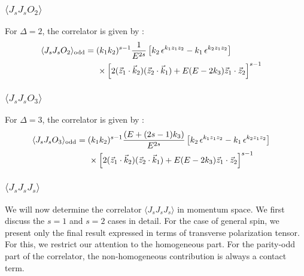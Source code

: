 \documentclass[a4paper,11pt]{article}
\begin{document}
\subsubsection*{$\langle J_sJ_sO_{2}\rangle$}
For $\Delta=2$, the correlator is given by :
\begin{align}
\langle J_sJ_sO_{2}\rangle_{\text{odd}}&=(k_1 k_2)^{s-1}\frac{1}{E^{2s}}\left[k_2\,\epsilon^{ k_1 z_1 z_2}- k_1\,\epsilon^{k_2 z_1  z_2}\right]\cr
&\hspace{.5cm}\times \left[2(\vec{z}_1\cdot \vec{k}_2)( \vec{z}_2\cdot \vec{k}_1) +E (E-2k_3)\vec{z}_1\cdot \vec{z}_2 \right]^{s-1}
\end{align}
\subsubsection*{$\langle J_sJ_sO_{3}\rangle$}
For $\Delta=3$, the correlator is given by :
\begin{align}
\langle J_sJ_sO_{3}\rangle_{\text{odd}}&=(k_1 k_2)^{s-1}\frac{(E+(2s-1)k_3)}{E^{2s}}\left[k_2\,\epsilon^{ k_1 z_1 z_2}- k_1\,\epsilon^{k_2 z_1  z_2}\right]\cr
&\hspace{.5cm}\times \left[2(\vec{z}_1\cdot \vec{k}_2)( \vec{z}_2\cdot \vec{k}_1) +E (E-2k_3)\vec{z}_1\cdot \vec{z}_2 \right]^{s-1}
\end{align}
\subsubsection{$\langle J_sJ_sJ_s\rangle$}
\label{jsjsjsmomentumsp}
We will now determine the correlator $\langle J_sJ_s J_s\rangle$ in momentum space. We first discuss the $s=1$ and $s=2$ cases in detail. For the case of general spin, we present only the final result expressed in terms of transverse polarization tensor. For this, we restrict our attention to the homogeneous part. For the parity-odd part of the correlator, the non-homogeneous contribution is always a contact term.
\end{document}
